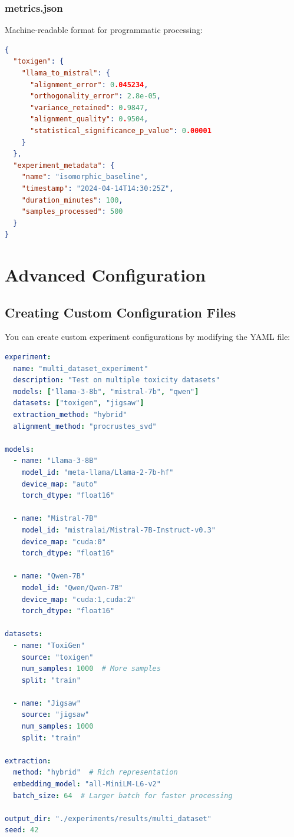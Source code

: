 \documentclass[12pt,a4paper,oneside]{report}
\begin{document}
\subsection{metrics.json}

Machine-readable format for programmatic processing:

\begin{lstlisting}[language=JSON, caption=Sample metrics.json]
{
  "toxigen": {
    "llama_to_mistral": {
      "alignment_error": 0.045234,
      "orthogonality_error": 2.8e-05,
      "variance_retained": 0.9847,
      "alignment_quality": 0.9504,
      "statistical_significance_p_value": 0.00001
    }
  },
  "experiment_metadata": {
    "name": "isomorphic_baseline",
    "timestamp": "2024-04-14T14:30:25Z",
    "duration_minutes": 100,
    "samples_processed": 500
  }
}
\end{lstlisting}

\clearpage
\chapter{Advanced Configuration}

\section{Creating Custom Configuration Files}

You can create custom experiment configurations by modifying the YAML file:

\begin{lstlisting}[language=YAML, caption=Example: custom_experiment.yaml]
experiment:
  name: "multi_dataset_experiment"
  description: "Test on multiple toxicity datasets"
  models: ["llama-3-8b", "mistral-7b", "qwen"]
  datasets: ["toxigen", "jigsaw"]
  extraction_method: "hybrid"
  alignment_method: "procrustes_svd"

models:
  - name: "Llama-3-8B"
    model_id: "meta-llama/Llama-2-7b-hf"
    device_map: "auto"
    torch_dtype: "float16"

  - name: "Mistral-7B"
    model_id: "mistralai/Mistral-7B-Instruct-v0.3"
    device_map: "cuda:0"
    torch_dtype: "float16"

  - name: "Qwen-7B"
    model_id: "Qwen/Qwen-7B"
    device_map: "cuda:1,cuda:2"
    torch_dtype: "float16"

datasets:
  - name: "ToxiGen"
    source: "toxigen"
    num_samples: 1000  # More samples
    split: "train"

  - name: "Jigsaw"
    source: "jigsaw"
    num_samples: 1000
    split: "train"

extraction:
  method: "hybrid"  # Rich representation
  embedding_model: "all-MiniLM-L6-v2"
  batch_size: 64  # Larger batch for faster processing

output_dir: "./experiments/results/multi_dataset"
seed: 42
\end{lstlisting}
\end{document}
